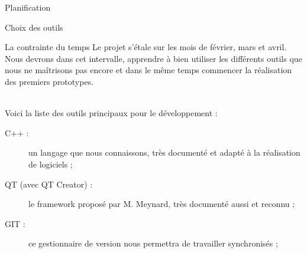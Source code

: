 \documentclass[a4paper, 12pt]{report}
\begin{document}
	\begin{part}{Planification}
		\begin{chapter}{Choix des outils}
			\begin{section}{La contrainte du temps}
				Le projet s'étale sur les mois de février, mars et avril.\\
				Nous devrons dans cet intervalle, apprendre à bien utiliser les différents outils que nous ne maîtrisons pas encore et dans le même temps commencer la réalisation des premiers prototypes.
			\end{section}~\\


			Voici la liste des outils principaux pour le développement :
			\begin{description}
				\item[C++ :] un langage que nous connaissons, très documenté et adapté à la réalisation de logiciels ;
				\item[QT (avec QT Creator) :] le framework proposé par M. Meynard, très documenté aussi et reconnu ;
				\item[GIT :] ce gestionnaire de version nous permettra de travailler synchronisés ;		
			\end{description}~\\


\end{chapter}
\end{part}
\end{document}
